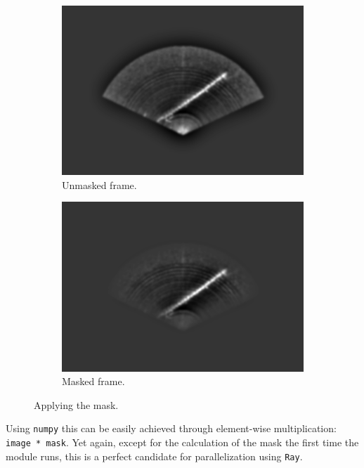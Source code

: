 \begin{figure}[H]
    \centering
    \begin{subfigure}[b]{.45\textwidth}
        \centering
        \includegraphics[width=\textwidth]{figures/pipeline/Bandpass.png}
        \caption{Unmasked frame.}
    \end{subfigure}
    \hfill
    \begin{subfigure}[b]{.45\textwidth}
        \centering
        \includegraphics[width=\textwidth]{figures/pipeline/Masking.png}
        \caption{Masked frame.}
    \end{subfigure}
    \caption{Applying the mask.}
    \label{fig:mask-application}
\end{figure}

Using \texttt{numpy} this can be easily achieved through element-wise multiplication: \lstinline{image * mask}. Yet again, except for the calculation of the mask the first time the module runs, this is a perfect candidate for parallelization using \texttt{Ray}.

